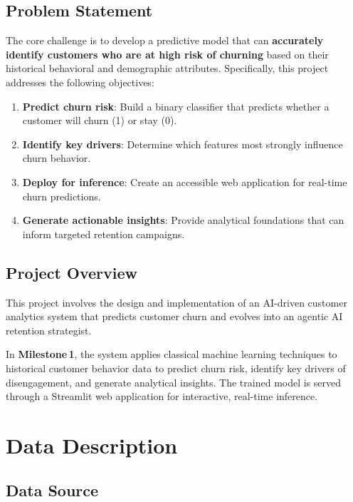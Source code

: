 \documentclass[12pt, a4paper]{article}
\begin{document}
\subsection{Problem Statement}

The core challenge is to develop a predictive model that can \textbf{accurately identify customers who are at high risk of churning} based on their historical behavioral and demographic attributes. Specifically, this project addresses the following objectives:

\begin{enumerate}[label=\arabic*.]
    \item \textbf{Predict churn risk}: Build a binary classifier that predicts whether a customer will churn (1) or stay (0).
    \item \textbf{Identify key drivers}: Determine which features most strongly influence churn behavior.
    \item \textbf{Deploy for inference}: Create an accessible web application for real-time churn predictions.
    \item \textbf{Generate actionable insights}: Provide analytical foundations that can inform targeted retention campaigns.
\end{enumerate}

\subsection{Project Overview}

This project involves the design and implementation of an AI-driven customer analytics system that predicts customer churn and evolves into an agentic AI retention strategist.

In \textbf{Milestone\,1}, the system applies classical machine learning techniques to historical customer behavior data to predict churn risk, identify key drivers of disengagement, and generate analytical insights. The trained model is served through a Streamlit web application for interactive, real-time inference.

\section{Data Description}

\subsection{Data Source}
\end{document}
